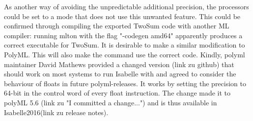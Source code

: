 \documentclass[11pt,a4paper]{article}
\begin{document}
As another way of avoiding the unpredictable additional precision, the processors could be set to a mode that does not use this unwanted feature. This could be confirmed through compiling the exported TwoSum code with another ML compiler: running mlton with the flag "-codegen amd64" apparently produces a correct executable for TwoSum. It is desirable to make a similar modification to PolyML. This will also make the
command use the correct code. Kindly, polyml maintainer David Mathews provided a changed version (link zu github) that should work on most systems to run Isabelle with and agreed to consider the behaviour of floats in future polyml-releases. It works by setting the precision to 64-bit in the control word of every float instruction. The change made it to polyML 5.6 (link zu "I committed a change...") and is thus available in Isabelle2016(link zu release notes).


%
%
\end{document}
